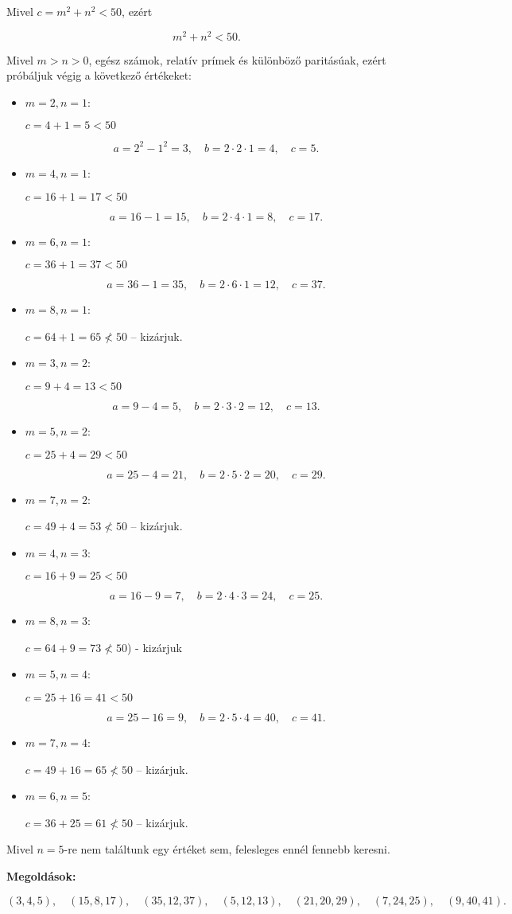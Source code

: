 \begin{solution}
Mivel $c=m^{2}+n^{2}<50$, ezért

\[
m^{2}+n^{2}<50.
\]

Mivel $m>n>0$, egész számok, relatív prímek és különböző paritásúak,
ezért próbáljuk végig a következő értékeket:
\begin{itemize}
\item $m=2,n=1$:

$c=4+1=5<50$

\[
a=2^{2}-1^{2}=3,\quad b=2\cdot2\cdot1=4,\quad c=5.
\]

\item $m=4,n=1$:

$c=16+1=17<50$

\[
a=16-1=15,\quad b=2\cdot4\cdot1=8,\quad c=17.
\]

\item $m=6,n=1$:

$c=36+1=37<50$

\[
a=36-1=35,\quad b=2\cdot6\cdot1=12,\quad c=37.
\]

\item $m=8,n=1$:

$c=64+1=65\not<50$ -- kizárjuk.
\item $m=3,n=2$:

$c=9+4=13<50$

\[
a=9-4=5,\quad b=2\cdot3\cdot2=12,\quad c=13.
\]

\item $m=5,n=2$:

$c=25+4=29<50$

\[
a=25-4=21,\quad b=2\cdot5\cdot2=20,\quad c=29.
\]

\item $m=7,n=2$:

$c=49+4=53\not<50$ -- kizárjuk.
\item $m=4,n=3$:

$c=16+9=25<50$

\[
a=16-9=7,\quad b=2\cdot4\cdot3=24,\quad c=25.
\]

\item $m=8,n=3$:

$c=64+9=73\not<50$) - kizárjuk
\item $m=5,n=4$:

$c=25+16=41<50$

\[
a=25-16=9,\quad b=2\cdot5\cdot4=40,\quad c=41.
\]

\item $m=7,n=4$:

$c=49+16=65\not<50$ -- kizárjuk.
\item $m=6,n=5$:

$c=36+25=61\not<50$ -- kizárjuk.

\end{itemize}
Mivel $n=5$-re nem találtunk egy értéket sem, felesleges ennél fennebb
keresni.

\textbf{Megoldások:}

\[
(3,4,5),\quad(15,8,17),\quad(35,12,37),\quad(5,12,13),\quad(21,20,29),\quad(7,24,25),\quad(9,40,41).
\]
\end{solution}

